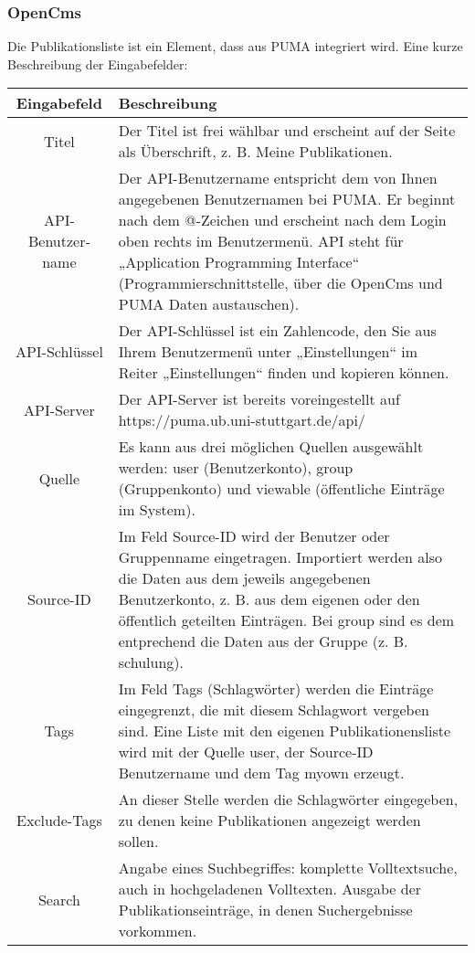 \documentclass[b5paper,11pt,twoside]{scrbook} %
\begin{document}
\subsubsection{OpenCms}
Die Publikationsliste ist ein Element, dass aus PUMA integriert wird. 
\newline\newline
Eine kurze Beschreibung der Eingabefelder:\newline
\small
\begin{longtable}{|c|p{7cm}|}\hline
\bfseries Eingabefeld &\bfseries Beschreibung\\ \hline
Titel& 	Der Titel ist frei wählbar und erscheint auf der Seite als Überschrift, z. B. Meine Publikationen. \\ \hline
API-Benutzer­­name &	Der API-Benutzername entspricht dem von Ihnen angegebenen Benutzernamen bei PUMA. Er beginnt nach dem @-Zeichen und erscheint nach dem Login oben rechts im Benutzermenü. API steht für „Application Programming Interface“ (Programmierschnittstelle, über die OpenCms und PUMA Daten austauschen).\\ \hline
API-Schlüssel &	Der API-Schlüs­sel ist ein Zahlencode, den Sie aus Ihrem Benutzermenü unter „Einstellungen“ im Reiter „Einstellungen“ finden und kopieren können.\\ \hline
API-Server &	Der API-Server ist bereits voreingestellt auf https://puma.ub.uni-stuttgart.de/api/\\ \hline
Quelle & Es kann aus drei möglichen Quellen ausgewählt werden: user (Benutzerkonto), group (Gruppenkonto) und viewable (öffentliche Einträge im System).\\ \hline
Source-ID &	Im Feld Source-ID wird der Benutzer oder Gruppenname eingetragen. Importiert werden also die Daten aus dem jeweils angegebenen Benutzerkonto, z. B. aus dem eigenen oder den öffentlich geteilten Einträgen. Bei group sind es dem entprechend die Daten aus der Gruppe (z. B. schulung).\\ \hline
Tags &	Im Feld Tags (Schlagwörter) werden die Einträge eingegrenzt, die mit diesem Schlagwort vergeben sind. Eine Liste mit den eigenen Publikationensliste wird mit der Quelle user, der Source-ID Benutzername und dem Tag myown erzeugt.\\ \hline
Exclude-Tags& An dieser Stelle werden die Schlagwörter eingegeben, zu denen keine Publikationen angezeigt werden sollen.\\ \hline
Search &	Angabe eines Suchbegriffes: komplette Volltextsuche, auch in hochgeladenen Volltexten. Ausgabe der Publikationseinträge, in denen Suchergebnisse vorkommen.\\ \hline

\end{longtable}
\end{document}
